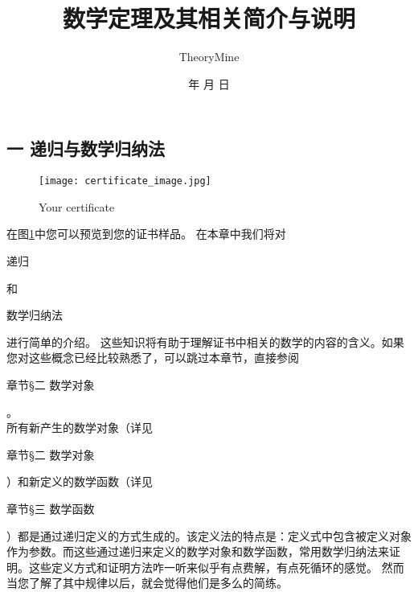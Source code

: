 \documentclass[twocolumn]{article}
\begin{document}
\begin{CJK}{UTF8}{gbsn}

\renewcommand{\today}{\number\year 年 \number\month 月 \number\day 日}
\renewcommand{\figurename}{图}

\title{
数学定理及其相关简介与说明
}
\author{TheoryMine}

\date{\today}


\newcommand{\nat}{\mathbb{N}}
\newcommand{\bool}{\text{Bool}}
\newcommand{\nl}{\\}

\maketitle

\section*{一 递归与数学归纳法}
\label{recursion}


\begin{figure}[hbt]
\begin{center}
\texttt{[image: certificate\_image.jpg]}
\end{center}
\caption{Your certificate}
\label{certificate}
\end{figure}

\indent \indent  在图\ref{certificate}中您可以预览到您的证书样品。 在本章中我们将对\begin{CJK}{UTF8}{gkai}递归\end{CJK}和\begin{CJK}{UTF8}{gkai}数学归纳法\end{CJK}进行简单的介绍。 这些知识将有助于理解证书中相关的数学的内容的含义。如果您对这些概念已经比较熟悉了，可以跳过本章节，直接参阅\begin{CJK}{UTF8}{gkai}章节\S 二 数学对象\end{CJK}
。\\


\indent \indent 所有新产生的数学对象（详见\begin{CJK}{UTF8}{gkai}章节\S 二 数学对象\end{CJK}）和新定义的数学函数（详见\begin{CJK}{UTF8}{gkai}章节\S 三 数学函数\end{CJK}）都是通过递归定义的方式生成的。该定义法的特点是：定义式中包含被定义对象作为参数。而这些通过递归来定义的数学对象和数学函数，常用数学归纳法来证明。这些定义方式和证明方法咋一听来似乎有点费解，有点死循环的感觉。 然而当您了解了其中规律以后，就会觉得他们是多么的简练。\\


\end{CJK}
\end{document}
